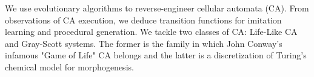  
 
 
 We use evolutionary algorithms to reverse-engineer cellular automata (CA). From observations of CA execution, we deduce transition functions for imitation learning and procedural generation. We tackle two classes of CA: Life-Like CA and Gray-Scott systems. The former is the family in which John Conway's infamous "Game of Life" CA belongs and the latter is a discretization of Turing's chemical model for morphogenesis.\\